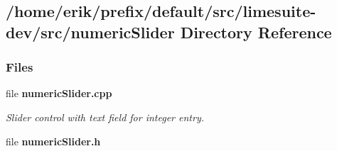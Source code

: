 \subsection{/home/erik/prefix/default/src/limesuite-\/dev/src/numeric\+Slider Directory Reference}
\label{dir_f5e8192ca1397ca34acaf02f2f36e3c8}
\subsubsection*{Files}
\begin{DoxyCompactItemize}
\item 
file {\bf numeric\+Slider.\+cpp}
\begin{DoxyCompactList}\small\item\em Slider control with text field for integer entry. \end{DoxyCompactList}\item 
file {\bf numeric\+Slider.\+h}
\end{DoxyCompactItemize}
